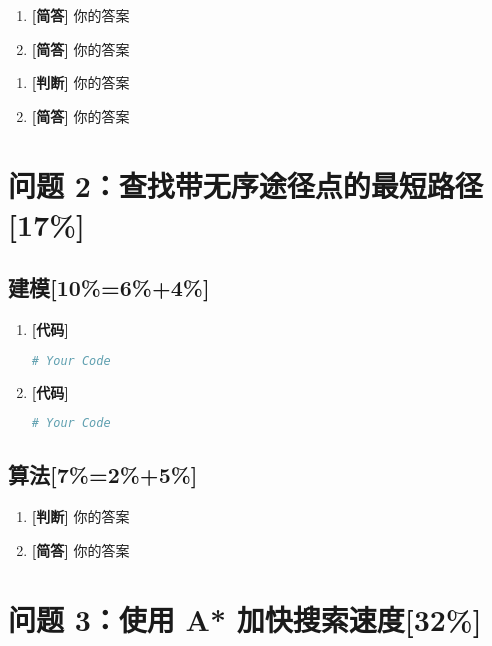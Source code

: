 \documentclass{article}
\begin{document}
\begin{enumerate}[label=(\alph*), start=3]
    \item \textbf{[简答]} %
    你的答案
    \item \textbf{[简答]} %
    你的答案
\end{enumerate}

\begin{enumerate}[label=(\alph*), start=5]
    \item \textbf{[判断]} %
    你的答案
    \item \textbf{[简答]} %
    你的答案
\end{enumerate}

\section{问题 2：查找带无序途径点的最短路径[17\%]}

\subsection{建模[10\%=6\%+4\%]}

\begin{enumerate}[label=(\alph*), start=1]

    \item \textbf{[代码]} %
    \begin{lstlisting}[language=Python]
    # Your Code
    \end{lstlisting}
    \item \textbf{[代码]} %
    \begin{lstlisting}[language=Python]
    # Your Code
    \end{lstlisting}
\end{enumerate}

\subsection{算法[7\%=2\%+5\%]}

\begin{enumerate}[label=(\alph*), start=3]

    \item \textbf{[判断]} %
    你的答案
    \item \textbf{[简答]} %
    你的答案
    
\end{enumerate}

\section{问题 3：使用 A* 加快搜索速度[32\%]}
\end{document}
